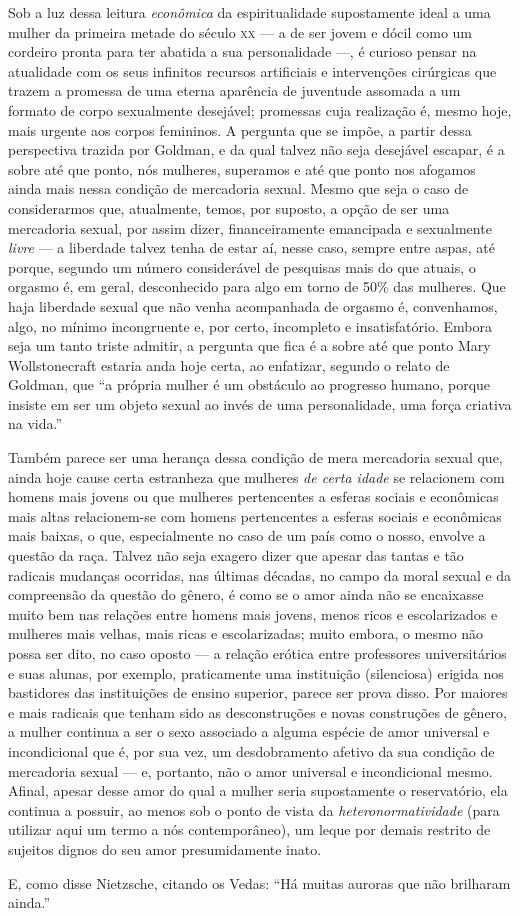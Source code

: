 Sob a luz dessa leitura \textit{econômica} da espiritualidade
supostamente ideal a uma mulher da primeira metade do século \textsc{xx} --- a de
ser jovem e dócil como um cordeiro pronta para ter abatida a sua
personalidade ---, é curioso pensar na atualidade com os seus infinitos
recursos artificiais e intervenções cirúrgicas que trazem a promessa de
uma eterna aparência de juventude assomada a um formato de corpo
sexualmente desejável; promessas cuja realização é, mesmo hoje, mais
urgente aos corpos femininos. A pergunta que se impõe, a partir dessa
perspectiva trazida por Goldman, e da qual talvez não seja desejável
escapar, é a sobre até que ponto, nós mulheres, superamos e até que
ponto nos afogamos ainda mais nessa condição de mercadoria sexual. Mesmo
que seja o caso de considerarmos que, atualmente, temos, por suposto, a
opção de ser uma mercadoria sexual, por assim dizer, financeiramente
emancipada e sexualmente \textit{livre} --- a liberdade talvez tenha de estar
aí, nesse caso, sempre entre aspas, até porque, segundo um número
considerável de pesquisas mais do que atuais, o orgasmo é, em geral,
desconhecido para algo em torno de 50\% das mulheres. Que haja liberdade
sexual que não venha acompanhada de orgasmo é, convenhamos, algo, no
mínimo incongruente e, por certo, incompleto e insatisfatório. Embora
seja um tanto triste admitir, a pergunta que fica é a sobre até que
ponto Mary Wollstonecraft estaria anda hoje certa, ao enfatizar, segundo
o relato de Goldman, que ``a própria mulher é um obstáculo ao progresso
humano, porque insiste em ser um objeto sexual ao invés de uma
personalidade, uma força criativa na vida.''

Também parece ser uma herança dessa condição de mera mercadoria sexual
que, ainda hoje cause certa estranheza que mulheres \textit{de certa idade}
se relacionem com homens mais jovens ou que mulheres pertencentes a
esferas sociais e econômicas mais altas relacionem-se com homens
pertencentes a esferas sociais e econômicas mais baixas, o que,
especialmente no caso de um país como o nosso, envolve a questão da
raça. Talvez não seja exagero dizer que apesar das tantas e tão radicais
mudanças ocorridas, nas últimas décadas, no campo da moral sexual e da
compreensão da questão do gênero, é como se o amor ainda não se
encaixasse muito bem nas relações entre homens mais jovens, menos ricos
e escolarizados e mulheres mais velhas, mais ricas e escolarizadas;
muito embora, o mesmo não possa ser dito, no caso oposto --- a relação
erótica entre professores universitários e suas alunas, por exemplo,
praticamente uma instituição (silenciosa) erigida nos bastidores das
instituições de ensino superior, parece ser prova disso. Por maiores e
mais radicais que tenham sido as desconstruções e novas construções de
gênero, a mulher continua a ser o sexo associado a alguma espécie de
amor universal e incondicional que é, por sua vez, um desdobramento
afetivo da sua condição de mercadoria sexual --- e, portanto, não o amor
universal e incondicional mesmo. Afinal, apesar desse amor do qual a
mulher seria supostamente o reservatório, ela continua a possuir, ao
menos sob o ponto de vista da \textit{heteronormatividade} (para utilizar aqui um
termo a nós contemporâneo), um leque por demais restrito de sujeitos
dignos do seu amor presumidamente inato.

E, como disse Nietzsche, citando os Vedas: ``Há muitas auroras que não
brilharam ainda.''

